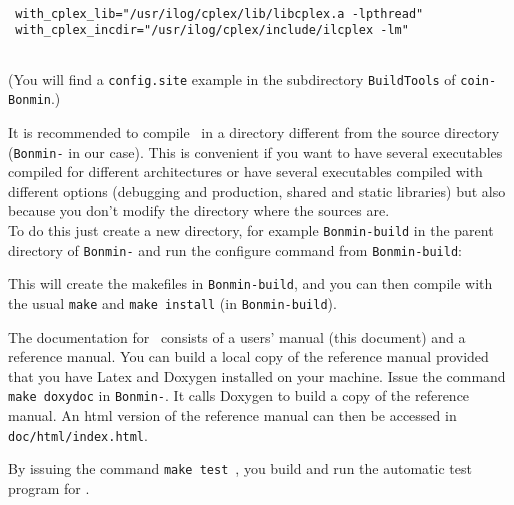 \begin{colorverb}
 \begin{verbatim}

 with_cplex_lib="/usr/ilog/cplex/lib/libcplex.a -lpthread"
 with_cplex_incdir="/usr/ilog/cplex/include/ilcplex -lm"
 
 \end{verbatim}
\end{colorverb}

 (You will find a {\tt config.site} example in the subdirectory {\tt BuildTools} of {\tt coin-Bonmin}.)

It is recommended to compile \Bonmin\ in a directory different from the source directory ({\tt Bonmin-\stableVersion} in our case).
This is convenient if you want to have several executables compiled for different architectures or have several executables compiled with different options
(debugging and production, shared and static libraries) but also because
you don't modify the directory where the sources are.\\

To do this just create a new directory, for example {\tt Bonmin-build} in the parent directory of
{\tt Bonmin-\stableVersion} and run the configure command from {\tt Bonmin-build}:

\begin{colorverb}
\end{colorverb}

This will create the makefiles in {\tt Bonmin-build}, and
you can then compile with the usual {\tt make} and {\tt make install}
(in {\tt Bonmin-build}).

The documentation for \Bonmin\ consists of a users' manual (this document) and a reference manual.
You can build a local copy of the reference manual provided that you have Latex
and Doxygen installed on your machine. Issue the command {\tt make
doxydoc} in {\tt Bonmin-\stableVersion}. It calls Doxygen to build a copy of the
reference manual. An html version of the reference manual can then
be accessed in {\tt doc/html/index.html}.


By issuing the command {\tt make test}~, you build and run the automatic test program for \Bonmin.
